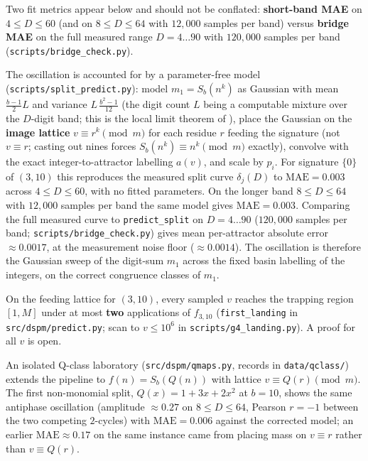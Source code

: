 \documentclass[11pt]{article}
\theoremstyle{definition}
\theoremstyle{remark}
\begin{document}
Two fit metrics appear below and should not be conflated: \textbf{short-band MAE} on $4 \le D \le 60$ (and on $8 \le D \le 64$ with $12{,}000$ samples per band) versus \textbf{bridge MAE} on the full measured range $D=4\ldots 90$ with $120{,}000$ samples per band (\texttt{scripts/bridge\_check.py}).

The oscillation is accounted for by a parameter-free model (\texttt{scripts/split\_predict.py}): model $m_1 = S_b(n^k)$ as Gaussian with mean $\tfrac{b-1}{2}L$ and variance $L\,\tfrac{b^2-1}{12}$ (the digit count $L$ being a computable mixture over the $D$-digit band; this is the local limit theorem of \cite{mauduit-rivat,dmr}), place the Gaussian on the \textbf{image lattice} $v \equiv r^k \pmod m$ for each residue $r$ feeding the signature (not $v \equiv r$; casting out nines forces $S_b(n^k) \equiv n^k \pmod m$ exactly), convolve with the exact integer-to-attractor labelling $a(v)$, and scale by $p_i$. For signature $\{0\}$ of $(3,10)$ this reproduces the measured split curve $\delta_j(D)$ to $\mathrm{MAE} = 0.003$ across $4 \le D \le 60$, with no fitted parameters. On the longer band $8 \le D \le 64$ with $12{,}000$ samples per band the same model gives $\mathrm{MAE} = 0.003$. Comparing the full measured curve to \texttt{predict\_split} on $D=4\ldots 90$ ($120{,}000$ samples per band; \texttt{scripts/bridge\_check.py}) gives mean per-attractor absolute error \textbf{$\approx 0.0017$}, at the measurement noise floor ($\approx 0.0014$). The oscillation is therefore the Gaussian sweep of the digit-sum $m_1$ across the fixed basin labelling of the integers, on the correct congruence classes of $m_1$.

On the feeding lattice for $(3,10)$, every sampled $v$ reaches the trapping region $[1,M]$ under at most \textbf{two} applications of $f_{3,10}$ (\texttt{first\_landing} in \texttt{src/dspm/predict.py}; scan to $v \le 10^6$ in \texttt{scripts/g4\_landing.py}). A proof for all $v$ is open.

An isolated Q-class laboratory (\texttt{src/dspm/qmaps.py}, records in \texttt{data/qclass/}) extends the pipeline to $f(n)=S_b(Q(n))$ with lattice $v \equiv Q(r) \pmod m$. The first non-monomial split, $Q(x)=1+3x+2x^2$ at $b=10$, shows the same antiphase oscillation (amplitude $\approx 0.27$ on $8 \le D \le 64$, Pearson $r=-1$ between the two competing $2$-cycles) with $\mathrm{MAE} = 0.006$ against the corrected model; an earlier $\mathrm{MAE} \approx 0.17$ on the same instance came from placing mass on $v \equiv r$ rather than $v \equiv Q(r)$.
\end{document}
